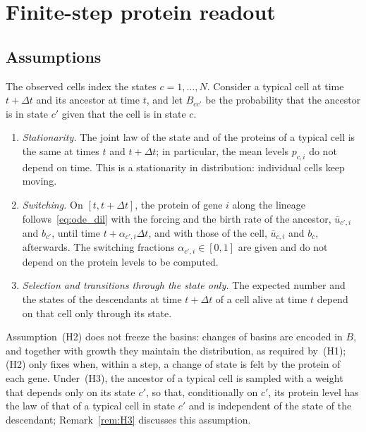 \documentclass[a4paper, 11pt]{article}
\theoremstyle{plain}
\theoremstyle{remark}
\begin{document}
\section{Finite-step protein readout}\label{sup:finite}

\subsection{Assumptions}

The observed cells index the states $c = 1, \dots, N$. Consider a typical cell at time $t + \Delta t$ and its ancestor at time $t$, and let $B_{cc'}$ be the probability that the ancestor is in state $c'$ given that the cell is in state $c$.
\begin{enumerate}[label=(H\arabic*)]
\item \emph{Stationarity.} The joint law of the state and of the proteins of a typical cell is the same at times $t$ and $t + \Delta t$; in particular, the mean levels $p_{c,i}$ do not depend on time. This is a stationarity in distribution: individual cells keep moving.
\item \emph{Switching.} On $[t, t + \Delta t]$, the protein of gene $i$ along the lineage follows~\eqref{eq:ode_dil} with the forcing and the birth rate of the ancestor, $\bar u_{c',i}$ and $b_{c'}$, until time $t + \alpha_{c',i}\Delta t$, and with those of the cell, $\bar u_{c,i}$ and $b_c$, afterwards. The switching fractions $\alpha_{c',i} \in [0,1]$ are given and do not depend on the protein levels to be computed.
\item \emph{Selection and transitions through the state only.} The expected number and the states of the descendants at time $t + \Delta t$ of a cell alive at time $t$ depend on that cell only through its state.
\end{enumerate}
Assumption~(H2) does not freeze the basins: changes of basins are encoded in $B$, and together with growth they maintain the distribution, as required by~(H1); (H2) only fixes when, within a step, a change of state is felt by the protein of each gene. Under~(H3), the ancestor of a typical cell is sampled with a weight that depends only on its state $c'$, so that, conditionally on $c'$, its protein level has the law of that of a typical cell in state $c'$ and is independent of the state of the descendant; Remark~\ref{rem:H3} discusses this assumption.
\end{document}
